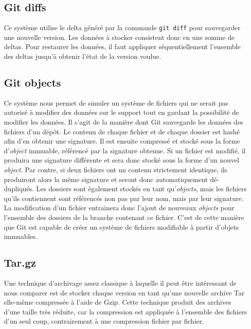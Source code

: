 \documentclass[a4paper]{report}
\begin{document}
\subsection{Git diffs}

Ce système utilise le delta généré par la commande \verb|git diff|
pour sauvegarder une nouvelle version. Les données à stocker consistent
donc en une somme de deltas. Pour restaurer les données, il faut
appliquer séquentiellement l'ensemble des deltas jusqu'à obtenir l'état
de la version voulue.

\subsection{Git objects}

Ce système nous permet de simuler un système de fichiers qui ne serait
pas autorisé à modifier des données sur le support tout en gardant la
possibilité de modifier les données. Il s'agit de la manière dont Git
sauvegarde les données des fichiers d'un dépôt. Le contenu de chaque
fichier et de chaque dossier est hashé afin d'en obtenir une signature.
Il est ensuite compressé et stocké sous la forme d'\emph{object}
immuable, référencé par la signature obtenue. Si un fichier est modifié,
il produira une signature différente et sera donc stocké sous la forme
d'un nouvel \emph{object}. Par contre, si deux fichiers ont un contenu
strictement identique, ils produiront alors la même signature et seront
donc automatiquement dé-dupliqués. Les dossiers sont également stockés
en tant qu'\emph{objects}, mais les fichiers qu'ils contiennent sont
référencés non pas par leur nom, mais par leur signature. La
modification d'un fichier entrainera donc l'ajout de nouveaux
\emph{objects} pour l'ensemble des dossiers de la branche contenant ce
fichier. C'est de cette manière que Git est capable de créer un système
de fichiers modifiable à partir d'objets immuables.

\subsection{Tar.gz}

Une technique d'archivage assez classique à laquelle il peut être
intéressant de nous comparer est de stocker chaque version en tant
qu'une nouvelle archive Tar elle-même compressée à l'aide de Gzip. Cette
technique produit des archives d'une taille très réduite, car la
compression est appliquée à l'ensemble des fichiers d'un seul coup,
contrairement à une compression fichier par fichier.
\end{document}
